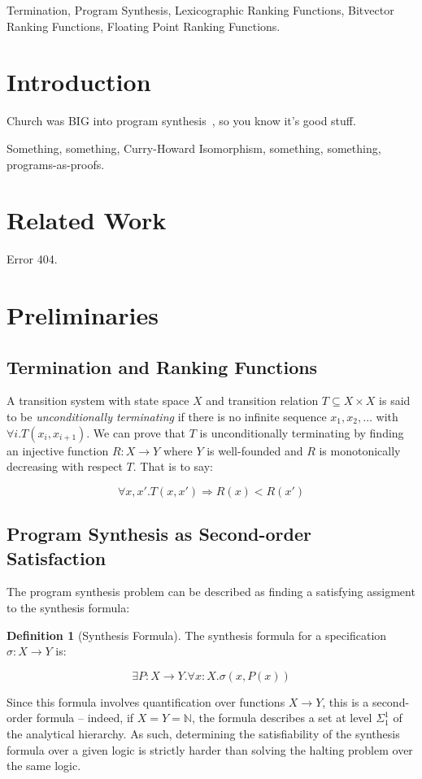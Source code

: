 \documentclass[preprint]{sigplanconf}
\theoremstyle{definition}
\newtheorem{definition}[theorem]{Definition}
\begin{document}
\keywords
Termination, Program Synthesis, Lexicographic Ranking Functions, Bitvector Ranking Functions,
Floating Point Ranking Functions.

\section{Introduction}
Church was BIG into program synthesis~\cite{church-synth}, so you know it's good stuff.

Something, something, Curry-Howard Isomorphism, something, something, programs-as-proofs.

\section{Related Work}
Error 404.

\section{Preliminaries}
\subsection{Termination and Ranking Functions}
A transition system with state space $X$ and transition relation $T \subseteq X \times X$
is said to be \emph{unconditionally terminating} if there is no infinite sequence
$x_1, x_2, \ldots$ with $\forall i . T(x_i, x_{i+1})$.  We can prove that $T$ is
unconditionally terminating by finding an injective function $R: X \to Y$ where
$Y$ is well-founded and $R$ is monotonically decreasing with respect $T$.  That is
to say:

$$\forall x, x' . T(x, x') \Rightarrow R(x) < R(x')$$

\subsection{Program Synthesis as Second-order Satisfaction}
The program synthesis problem can be described as finding a satisfying assigment to the
synthesis formula:

\begin{definition}[Synthesis Formula]
 The synthesis formula for a specification $\sigma: X \to Y$ is:
 
 $$\exists P: X \to Y . \forall x : X . \sigma(x, P(x))$$
 \end{definition}

Since this formula involves quantification over functions $X \to Y$,
this is a second-order formula -- indeed, if $X = Y = \mathbb{N}$,
the formula describes a set at level $\Sigma_1^1$ of the analytical
hierarchy.  As such, determining the satisfiability of the synthesis
formula over a given logic is strictly harder than solving the
halting problem over the same logic.
\end{document}
